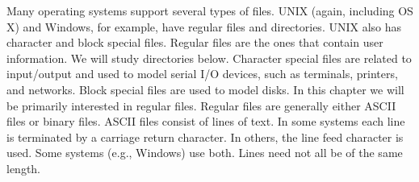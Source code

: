 Many operating systems support several types of files. UNIX (again, including
OS X) and Windows, for example, have regular files and directories. UNIX also
has character and block special files. Regular files are the ones that contain user
information.  We will study directories below.
Character special files are related to input/output and used to model serial I/O devices,
such as terminals, printers, and networks. Block special files are used to
model disks. In this chapter we will be primarily interested in regular files.
Regular files are generally either ASCII files or binary files. ASCII files consist
of lines of text. In some systems each line is terminated by a carriage return
character. In others, the line feed character is used. Some systems (e.g., Windows)
use both. Lines need not all be of the same length.

